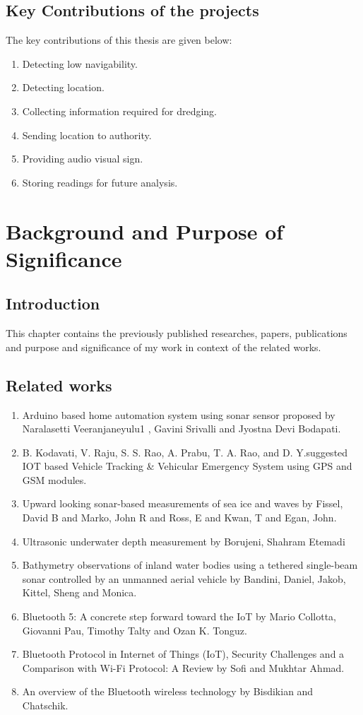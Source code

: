 \documentclass[12pt, top = 1 inch, bottom = 1 inch, left = 1.2 inch, top = .8 inch]{book}
\begin{document}
	\section{Key Contributions of the projects}
	The key contributions of this thesis are given below:
	\begin{enumerate}
		\item Detecting low navigability.
		\item Detecting location.
		\item Collecting information required for dredging.
		\item Sending location to authority.
		\item Providing audio visual sign. 
		\item Storing readings for future analysis.
	\end{enumerate}
	\chapter{Background and Purpose of Significance}
	\section{Introduction}
	This chapter contains the previously published researches, papers, publications and purpose and significance of my work in context of the related works.
	\section{Related works}
	\begin{enumerate}
		\item Arduino based home automation system using sonar sensor proposed by Naralasetti Veeranjaneyulu1 , Gavini Srivalli and Jyostna Devi Bodapati. \cite{wadhwani2018smart}
		\item B. Kodavati, V. Raju, S. S. Rao, A. Prabu, T. A. Rao, and D. Y.suggested IOT based Vehicle Tracking \& Vehicular Emergency System using GPS and GSM modules. \cite{kodavati2011gsm}  
		\item Upward looking sonar-based measurements of sea ice and waves by Fissel, David B and Marko, John R and Ross, E and Kwan, T and Egan, John. \cite{fissel2008upward}
		\item Ultrasonic underwater depth measurement by Borujeni, Shahram Etemadi \cite{borujeni2002ultrasonic}
		\item Bathymetry observations of inland water bodies using a tethered single-beam sonar controlled by an unmanned aerial vehicle by Bandini, Daniel, Jakob, Kittel, Sheng and Monica. \cite{bandini2018bathymetry}
		\item Bluetooth 5: A concrete step forward toward the IoT by Mario Collotta, Giovanni Pau, Timothy Talty and Ozan K. Tonguz. \cite{collotta2018bluetooth}
		\item Bluetooth Protocol in Internet of Things (IoT), Security Challenges and a Comparison with Wi-Fi Protocol: A Review by Sofi and Mukhtar Ahmad. \cite{sofibluetooth}
		\item An overview of the Bluetooth wireless technology by Bisdikian and Chatschik. \cite{bisdikian2001overview}
	\end{enumerate}
\end{document}
